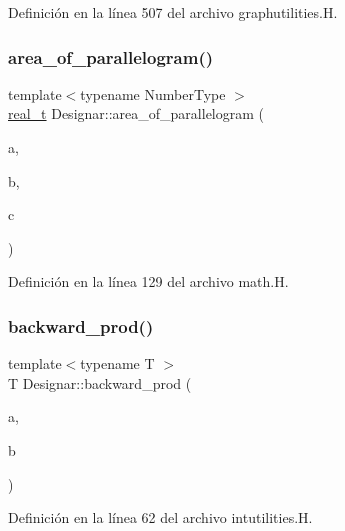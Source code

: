 Definición en la línea 507 del archivo graphutilities.\+H.

\mbox{\label{namespace_designar_a0e768d9436448a70b1a1e2ec87b4d0ca}} 
\subsubsection{\texorpdfstring{area\+\_\+of\+\_\+parallelogram()}{area\_of\_parallelogram()}}
{\footnotesize\ttfamily template$<$typename Number\+Type $>$ \\
\hyperlink{namespace_designar_aca2c32af26808dbec1f3a3071fad25ce}{real\+\_\+t} Designar\+::area\+\_\+of\+\_\+parallelogram (\begin{DoxyParamCaption}\item[{const \hyperlink{class_designar_1_1_gen_point2_d}{Gen\+Point2D}$<$ Number\+Type $>$ \&}]{a,  }\item[{const \hyperlink{class_designar_1_1_gen_point2_d}{Gen\+Point2D}$<$ Number\+Type $>$ \&}]{b,  }\item[{const \hyperlink{class_designar_1_1_gen_point2_d}{Gen\+Point2D}$<$ Number\+Type $>$ \&}]{c }\end{DoxyParamCaption})}



Definición en la línea 129 del archivo math.\+H.

\mbox{\label{namespace_designar_aed558aafc7789fb59b2381d0894b51cb}} 
\subsubsection{\texorpdfstring{backward\+\_\+prod()}{backward\_prod()}}
{\footnotesize\ttfamily template$<$typename T $>$ \\
T Designar\+::backward\+\_\+prod (\begin{DoxyParamCaption}\item[{T}]{a,  }\item[{T}]{b }\end{DoxyParamCaption})}



Definición en la línea 62 del archivo intutilities.\+H.

